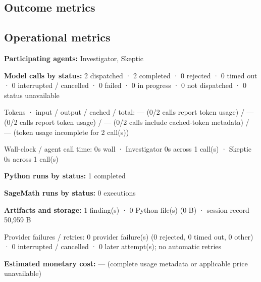 \documentclass[11pt]{article}
\begin{document}
\subsection{Outcome metrics}
\subsection{Operational metrics}
\textbf{Participating agents:} Investigator, Skeptic\par
\textbf{Model calls by status:} 2 dispatched · 2 completed · 0 rejected · 0 timed out · 0 interrupted / cancelled · 0 failed · 0 in progress · 0 not dispatched · 0 status unavailable\par
Tokens · input / output / cached / total: — (0/2 calls report token usage) / — (0/2 calls report token usage) / — (0/2 calls include cached-token metadata) / — (token usage incomplete for 2 call(s))\par
Wall-clock / agent call time: 0s wall · Investigator 0s across 1 call(s) · Skeptic 0s across 1 call(s)\par
\textbf{Python runs by status:} 1 completed\par
\textbf{SageMath runs by status:} 0 executions\par
\textbf{Artifacts and storage:} 1 finding(s) · 0 Python file(s) (0 B) · session record 50,959 B\par
Provider failures / retries: 0 provider failure(s) (0 rejected, 0 timed out, 0 other) · 0 interrupted / cancelled · 0 later attempt(s); no automatic retries\par
\textbf{Estimated monetary cost:} — (complete usage metadata or applicable price unavailable)\par
\end{document}
